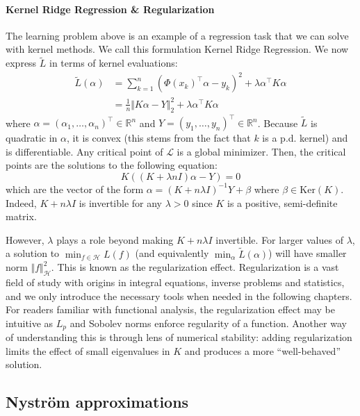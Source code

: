 \paragraph{Kernel Ridge Regression \& Regularization} The learning problem above is an example of a regression task that we can solve with kernel methods. We call this formulation Kernel Ridge Regression. We now express $\tilde L$ in terms of kernel evaluations:
\begin{align}
\tilde L(\alpha) &= \sum_{k=1}^n (\Phi(x_k)^\top \alpha - y_k)^2 + \lambda \alpha^\top K\alpha\\
               & = \frac{1}{n}\Vert K\alpha - Y \Vert_2^2 + \lambda \alpha^\top K\alpha
\end{align}
where $\alpha = (\alpha_1, \ldots, \alpha_n)^\top \in\mathbb R^n$ and $Y = (y_1, \ldots, y_n)^\top\in\mathbb R^n$. Because $\tilde L$ is quadratic in $\alpha$, it is convex (this stems from the fact that $k$ is a p.d. kernel) and is differentiable. Any critical point of $\mathcal L$ is a global minimizer. Then, the critical points are the solutions to the following equation:
\begin{equation}
K\left((K + \lambda n I)\alpha - Y\right) = 0
\end{equation}
which are the vector of the form $\alpha = (K + n\lambda I)^{-1}Y + \beta$ where $\beta \in \mathrm{Ker}(K)$. Indeed, $K + n\lambda I$ is invertible for any $\lambda > 0$ since $K$ is a positive, semi-definite matrix.

However, $\lambda$ plays a role beyond making $K+n\lambda I$ invertible. For larger values of $\lambda$, a solution to $\min_{f\in\mathcal H}L(f)$ (and equivalently $\min_\alpha \tilde L(\alpha)$) will have smaller norm $\Vert f \Vert_\mathcal H^2$. This is known as the regularization effect. Regularization is a vast field of study with origins in integral equations, inverse problems and statistics, and we only introduce the necessary tools when needed in the following chapters. For readers familiar with functional analysis, the regularization effect may be intuitive as $L_p$ and Sobolev norms enforce regularity of a function. Another way of understanding this is through lens of numerical stability: adding regularization limits the effect of small eigenvalues in $K$ and produces a more ``well-behaved'' solution.


\subsection{Nyström approximations}

